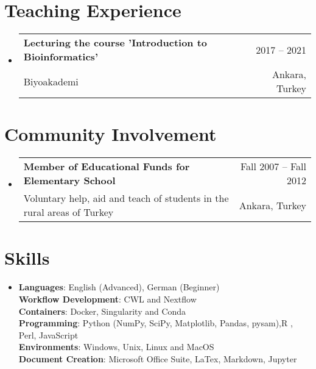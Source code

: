 \documentclass[A4,11pt]{article}
\makeatletter
\newcommand{\CVSubheading}[4]{
  \vspace{-2pt}\item
    \begin{tabular*}{0.97\textwidth}[t]{l@{\extracolsep{\fill}}r}
      \textbf{#1} & #2 \\
      \small#3 & \small #4 \\
    \end{tabular*}\vspace{-7pt}
}
\newcommand{\CVSubHeadingListStart}{\begin{itemize}[leftmargin=0.5cm, label={}]}
\newcommand{\CVSubHeadingListEnd}{\end{itemize}}
\makeatother
\begin{document}
\begin{comment}
Section is here as it applied to my application for positions in academia. 
Remember to tailor the resume for to the position.
\end{comment}

\section{Teaching Experience}
  \CVSubHeadingListStart
    \CVSubheading
      {Lecturing the course 'Introduction to Bioinformatics'}{2017 -- 2021}
      {Biyoakademi}{Ankara, Turkey}
  \CVSubHeadingListEnd

\section{Community Involvement}
  \CVSubHeadingListStart
    \CVSubheading
      {Member of Educational Funds for Elementary School}{Fall 2007 -- Fall 2012}
      {Voluntary help, aid and teach of students in the rural areas of Turkey}{Ankara, Turkey}
  \CVSubHeadingListEnd

\begin{comment}
This section is compressed from the various skills sections that Euro CV
recommends.
\end{comment}

\section{Skills}
 \begin{itemize}[leftmargin=0.5cm, label={}]
    \item{
     \textbf{Languages}{: English (Advanced), German (Beginner)} \\
    \textbf{Workflow Development}{: CWL and Nextflow} \\
    \textbf{Containers}{: Docker, Singularity and Conda} \\
    \textbf{Programming}{: Python (NumPy, SciPy, Matplotlib, Pandas, pysam),R , Perl, JavaScript} \\  
     \textbf{Environments}{: Windows, Unix, Linux and MacOS} \\
     \textbf{Document Creation}{: Microsoft Office Suite, LaTex, Markdown, Jupyter} \\
     
    }
 \end{itemize}
    
\end{document}
